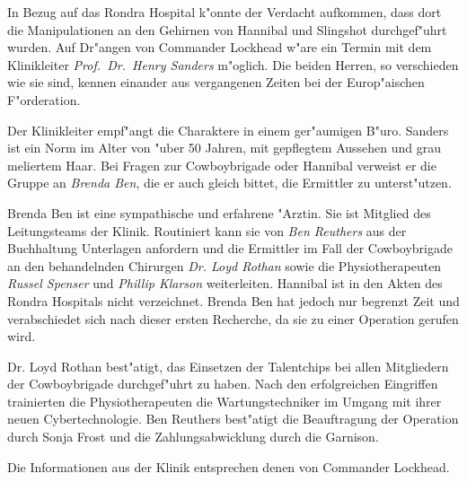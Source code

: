 
In Bezug auf das Rondra Hospital k"onnte der Verdacht aufkommen, dass dort die Manipulationen an den Gehirnen von Hannibal und Slingshot durchgef"uhrt wurden. Auf Dr"angen von Commander Lockhead w"are ein Termin mit dem Klinikleiter \emph{Prof.~Dr.~Henry Sanders} m"oglich. Die beiden Herren, so verschieden wie sie sind, kennen einander aus vergangenen Zeiten bei der Europ"aischen F"orderation.

Der Klinikleiter empf"angt die Charaktere in einem ger"aumigen B"uro. Sanders ist ein Norm im Alter von "uber 50 Jahren, mit gepflegtem Aussehen und grau meliertem Haar. Bei Fragen zur Cowboybrigade oder Hannibal verweist er die Gruppe an \emph{Brenda Ben}, die er auch gleich bittet, die Ermittler zu unterst"utzen.

Brenda Ben ist eine sympathische und erfahrene "Arztin. Sie ist Mitglied des Leitungsteams der Klinik. Routiniert kann sie von \emph{Ben Reuthers} aus der Buchhaltung Unterlagen anfordern und die Ermittler im Fall der Cowboybrigade an den behandelnden Chirurgen \emph{Dr. Loyd Rothan} sowie die Physiotherapeuten \emph{Russel Spenser} und \emph{Phillip Klarson} weiterleiten. Hannibal ist in den Akten des Rondra Hospitals nicht verzeichnet. Brenda Ben hat jedoch nur begrenzt Zeit und verabschiedet sich nach dieser ersten Recherche, da sie zu einer Operation gerufen wird.

Dr. Loyd Rothan best"atigt, das Einsetzen der Talentchips bei allen Mitgliedern der Cowboybrigade durchgef"uhrt zu haben. Nach den erfolgreichen Eingriffen trainierten die Physiotherapeuten die Wartungstechniker im Umgang mit ihrer neuen Cybertechnologie. Ben Reuthers best"atigt die Beauftragung der Operation durch Sonja Frost und die Zahlungsabwicklung durch die Garnison.

Die Informationen aus der Klinik entsprechen denen von Commander Lockhead.

